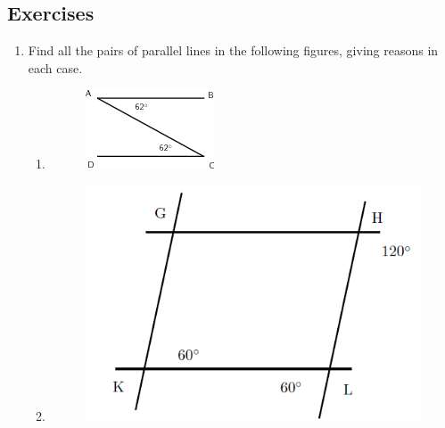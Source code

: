             \subsection{ Exercises}
            \nopagebreak
            \label{m39368*id320135}\begin{enumerate}[noitemsep, label=\textbf{\arabic*}. ] 
            \label{m39368*uid112}\item Find all the pairs of parallel lines in the following figures, giving reasons in each case.
\label{m39368*eip-78}\begin{enumerate}[noitemsep, label=\textbf{\alph*}. ] 
            \label{m39368*uid113}\item 
    \setcounter{subfigure}{0}
	\begin{figure}[H] %
    \begin{center}
    \label{m39368*id320164!!!underscore!!!media}\label{m39368*id320164!!!underscore!!!printimage}\includegraphics{col11306.imgs/m39368_MG10C13_054.png} %
      \vspace{2pt}
    \vspace{.1in}
    \end{center}
 \end{figure}       
        \label{m39368*uid114}\item 
    \setcounter{subfigure}{0}
	\begin{figure}[H] %
    \begin{center}
    \label{m39368*id320183!!!underscore!!!media}\label{m39368*id320183!!!underscore!!!printimage}\includegraphics{col11306.imgs/m39368_MG10C13_055.png} %

\end{center}
\end{figure}
\end{enumerate}
\end{enumerate}

